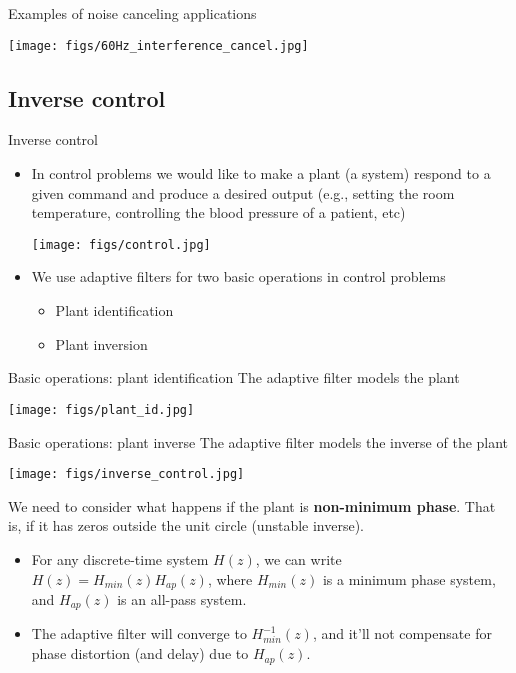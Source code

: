 \documentclass[10pt, aspectratio=169]{beamer}
\begin{document}
\begin{frame}{Examples of noise canceling applications}
\begin{center}
	\texttt{[image: figs/60Hz\_interference\_cancel.jpg]}
\end{center}

\end{frame}


\subsection{Inverse control}
\frame{\tableofcontents[currentsubsection]}
\begin{frame}{Inverse control}
\begin{itemize}
	\item In control problems we would like to make a plant (a system) respond to a given command and produce a desired output (e.g., setting the room temperature, controlling the blood pressure of a patient, etc)
	
	\begin{center}
		\texttt{[image: figs/control.jpg]}
	\end{center}
	
	\item We use adaptive filters for two basic operations in control problems
	\begin{itemize}
		\item \normalsize Plant identification
		\item \normalsize Plant inversion
	\end{itemize}
\end{itemize}
\end{frame}

\begin{frame}{Basic operations: plant identification}
	The adaptive filter models the plant
	\begin{center}
		\texttt{[image: figs/plant\_id.jpg]}
	\end{center}
\end{frame}


\begin{frame}{Basic operations: plant inverse}
The adaptive filter models the inverse of the plant
\begin{center}
	\texttt{[image: figs/inverse\_control.jpg]}
\end{center}
We need to consider what happens if the plant is \textbf{non-minimum phase}. That is, if it has zeros outside the unit circle (unstable inverse).
\begin{itemize}
	\item For any discrete-time system $H(z)$, we can write $H(z) = H_{min}(z)H_{ap}(z)$, where $H_{min}(z)$ is a minimum phase system, and $H_{ap}(z)$ is an all-pass system.
	\item The adaptive filter will converge to $H_{min}^{-1}(z)$, and it'll not compensate for phase distortion (and delay) due to $H_{ap}(z)$.
\end{itemize}
\end{frame}
\end{document}
